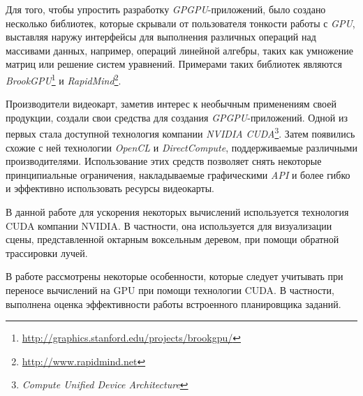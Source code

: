 Для того, чтобы упростить разработку \emph{GPGPU}-приложений, было создано несколько библиотек, которые скрывали от пользователя тонкости работы с \emph{GPU}, выставляя наружу интерфейсы для выполнения различных операций над массивами данных, например, операций линейной алгебры, таких как умножение матриц или решение систем уравнений. Примерами таких библиотек являются \emph{BrookGPU}\footnote{\url{http://graphics.stanford.edu/projects/brookgpu/}} и \emph{RapidMind}\footnote{\url{http://www.rapidmind.net}}.

Производители видеокарт, заметив интерес к необычным применениям своей продукции, создали свои средства для создания \emph{GPGPU}-приложений. Одной из первых стала доступной технология компании \emph{NVIDIA} \emph{CUDA}\footnote{\emph{Compute Unified Device Architecture}}. Затем появились схожие с ней технологии \emph{OpenCL} и \emph{DirectCompute}, поддерживаемые различными производителями. Использование этих средств позволяет снять некоторые принципиальные ограничения, накладываемые графическими \emph{API} и более гибко и эффективно использовать ресурсы видеокарты.

В данной работе для ускорения некоторых вычислений используется технология CUDA компании NVIDIA. В частности, она используется для визуализации сцены, представленной октарным воксельным деревом, при помощи обратной трассировки лучей.

В работе рассмотрены некоторые особенности, которые следует учитывать при переносе вычислений на GPU при помощи технологии CUDA. В частности, выполнена оценка эффективности работы встроенного планировщика заданий.
